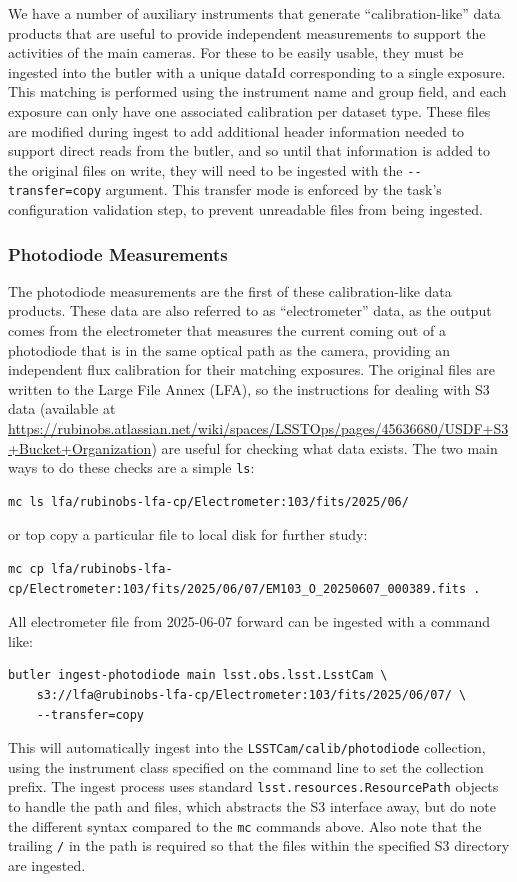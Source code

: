 \documentclass[DM,authoryear,toc]{lsstdoc}
\begin{document}
We have a number of auxiliary instruments that generate ``calibration-like'' data products that are useful to provide independent measurements to support the activities of the main cameras.
For these to be easily usable, they must be ingested into the butler with a unique dataId corresponding to a single exposure.
This matching is performed using the instrument name and group field, and each exposure can only have one associated calibration per dataset type.
These files are modified during ingest to add additional header information needed to support direct reads from the butler, and so until that information is added to the original files on write, they will need to be ingested with the \verb|--transfer=copy| argument.
This transfer mode is enforced by the task's configuration validation step, to prevent unreadable files from being ingested.

\subsubsection{Photodiode Measurements}

The photodiode measurements are the first of these calibration-like data products.
These data are also referred to as ``electrometer'' data, as the output comes from the electrometer that measures the current coming out of a photodiode that is in the same optical path as the camera, providing an independent flux calibration for their matching exposures.
The original files are written to the Large File Annex (LFA), so the instructions for dealing with S3 data (available at \url{https://rubinobs.atlassian.net/wiki/spaces/LSSTOps/pages/45636680/USDF+S3+Bucket+Organization}) are useful for checking what data exists.
The two main ways to do these checks are a simple \verb|ls|:
\begin{verbatim}
mc ls lfa/rubinobs-lfa-cp/Electrometer:103/fits/2025/06/
\end{verbatim}
or top copy a particular file to local disk for further study:
\begin{verbatim}
mc cp lfa/rubinobs-lfa-cp/Electrometer:103/fits/2025/06/07/EM103_O_20250607_000389.fits .
\end{verbatim}

All electrometer file from 2025-06-07 forward can be ingested with a command like:
\begin{verbatim}
butler ingest-photodiode main lsst.obs.lsst.LsstCam \
    s3://lfa@rubinobs-lfa-cp/Electrometer:103/fits/2025/06/07/ \
    --transfer=copy
\end{verbatim}
This will automatically ingest into the \verb|LSSTCam/calib/photodiode| collection, using the instrument class specified on the command line to set the collection prefix.
The ingest process uses standard \verb|lsst.resources.ResourcePath| objects to handle the path and files, which abstracts the S3 interface away, but do note the different syntax compared to the \verb|mc| commands above.
Also note that the trailing \verb|/| in the path is required so that the files within the specified S3 directory are ingested.
\end{document}
